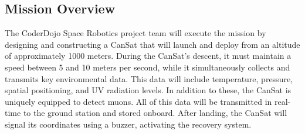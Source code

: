 \subsection{Mission Overview}

The CoderDojo Space Robotics project team will execute the mission by designing and constructing a CanSat that will launch and deploy from an altitude of approximately 1000 meters. During the CanSat's descent, it must maintain a speed between 5 and 10 meters per second, while it simultaneously collects and transmits key environmental data. This data will include temperature, pressure, spatial positioning, and UV radiation levels. In addition to these, the CanSat is uniquely equipped to detect muons. All of this data will be transmitted in real-time to the ground station and stored onboard. After landing, the CanSat will signal its coordinates using a buzzer, activating the recovery system.

